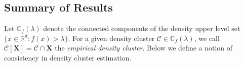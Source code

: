 \documentclass{article}
\newcommand{\Reals}{\mathbb{R}}
\newcommand{\Rd}{\Reals^d}
\newcommand{\1}{\mathbf{1}}
\newcommand{\Xbf}{\mathbf{X}}
\newcommand{\Cbb}{\mathbb{C}}
\newcommand{\Cset}{\mathcal{C}}
\theoremstyle{aldenthm}
\theoremstyle{aldenrmrk}
\begin{document}
\subsection{Summary of Results}





Let $\Cbb_f(\lambda)$ denote the connected components of the density upper level
set $\{x \in \Rd: f(x) > \lambda\}$.  For a given density cluster $\Cset \in
\Cbb_f(\lambda)$, we call $\Cset[\Xbf] = \Cset \cap \Xbf$ the \emph{empirical
  density cluster}. Below we define a notion of consistency in density cluster
estimation.     
\end{document}
